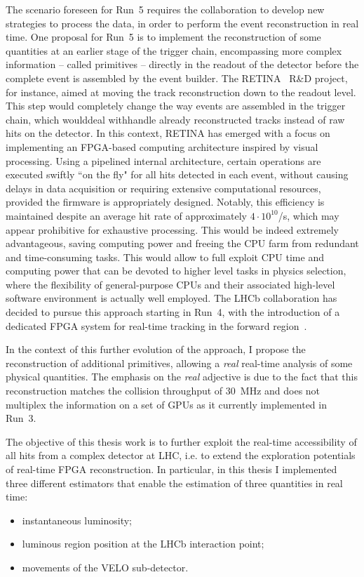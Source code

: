 The scenario foreseen for Run~5 requires the collaboration to develop new strategies to process the data, in order to perform the event reconstruction in real time. One proposal for Run~5 is to implement the reconstruction of some quantities at an earlier stage of the trigger chain, encompassing  more complex information -- called primitives -- directly in the readout of the detector before the complete event is assembled by the event builder. The RETINA~\cite{refId0} R\&D project, for instance, aimed at moving the track reconstruction down to the readout level. This step would completely change the way events are assembled in the trigger chain, which woulddeal withhandle already reconstructed tracks instead of raw hits on the detector. In this context, RETINA has emerged with a focus on implementing an FPGA-based computing architecture inspired by visual processing. Using a pipelined internal architecture, certain operations are executed swiftly ``on the fly" for all hits detected in each event, without causing delays in data acquisition or requiring extensive computational resources, provided the firmware is appropriately designed. Notably, this efficiency is maintained despite an average hit rate of approximately $4 \cdot 10^{10}$/s, which may appear prohibitive for exhaustive processing.
This would be indeed extremely advantageous, saving computing power and freeing the CPU farm from redundant and time-consuming tasks. This would allow to full exploit CPU time and computing power that can be devoted to higher level tasks in physics selection, where the flexibility of general-purpose CPUs and their associated high-level software environment is actually well employed. The LHCb collaboration has decided to pursue this approach starting in Run~4, with the introduction of a dedicated FPGA system for real-time tracking in the forward region~\cite{Morello:2888549}.

In the context of this further evolution of the approach, I propose the reconstruction of additional primitives, allowing a \textit{real} real-time analysis of some physical quantities. The emphasis on the \textit{real} adjective is due to the fact that this reconstruction matches the collision throughput of \SI{30}{\mega\hertz} and does not multiplex the information on a set of GPUs as it currently implemented in Run~3.

The objective of this thesis work is to further exploit the real-time accessibility of all hits from a complex detector at LHC, i.e. to extend the exploration potentials of real-time FPGA reconstruction. In particular, in this thesis I implemented three different estimators that enable the estimation of three quantities in real time:
\begin{itemize}
\item instantaneous luminosity;
\item luminous region position at the LHCb interaction point;
\item movements of the VELO sub-detector.
\end{itemize}

